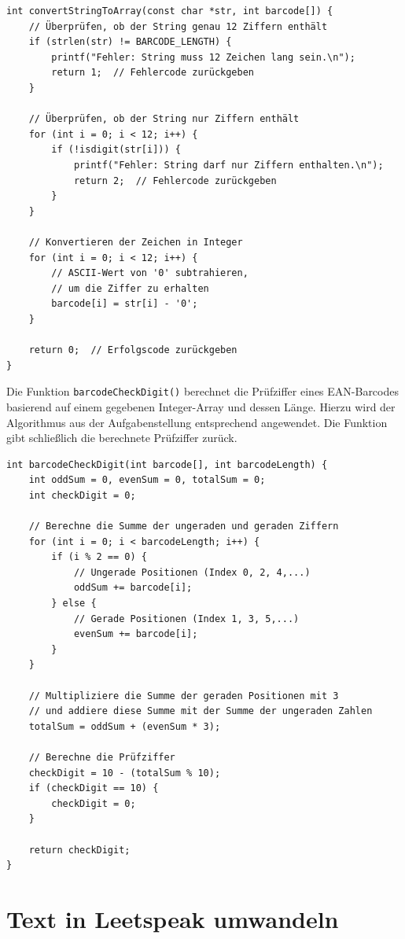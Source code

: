 \begin{verbatim}
int convertStringToArray(const char *str, int barcode[]) {
    // Überprüfen, ob der String genau 12 Ziffern enthält
    if (strlen(str) != BARCODE_LENGTH) {
        printf("Fehler: String muss 12 Zeichen lang sein.\n");
        return 1;  // Fehlercode zurückgeben
    }

    // Überprüfen, ob der String nur Ziffern enthält
    for (int i = 0; i < 12; i++) {
        if (!isdigit(str[i])) {
            printf("Fehler: String darf nur Ziffern enthalten.\n");
            return 2;  // Fehlercode zurückgeben
        }
    }

    // Konvertieren der Zeichen in Integer
    for (int i = 0; i < 12; i++) {
        // ASCII-Wert von '0' subtrahieren,
        // um die Ziffer zu erhalten
        barcode[i] = str[i] - '0';
    }

    return 0;  // Erfolgscode zurückgeben
}
\end{verbatim}

Die Funktion \texttt{barcodeCheckDigit()} berechnet die Prüfziffer eines
EAN-Barcodes basierend auf einem gegebenen Integer-Array und dessen Länge.
Hierzu wird der Algorithmus aus der Aufgabenstellung entsprechend angewendet.
Die Funktion gibt schließlich die berechnete Prüfziffer zurück.

\begin{verbatim}
int barcodeCheckDigit(int barcode[], int barcodeLength) {
    int oddSum = 0, evenSum = 0, totalSum = 0;
    int checkDigit = 0;

    // Berechne die Summe der ungeraden und geraden Ziffern
    for (int i = 0; i < barcodeLength; i++) {
        if (i % 2 == 0) {
            // Ungerade Positionen (Index 0, 2, 4,...)
            oddSum += barcode[i];
        } else {
            // Gerade Positionen (Index 1, 3, 5,...)
            evenSum += barcode[i];
        }
    }

    // Multipliziere die Summe der geraden Positionen mit 3
    // und addiere diese Summe mit der Summe der ungeraden Zahlen
    totalSum = oddSum + (evenSum * 3);

    // Berechne die Prüfziffer
    checkDigit = 10 - (totalSum % 10);
    if (checkDigit == 10) {
        checkDigit = 0;
    }

    return checkDigit;
}
\end{verbatim}




\chapter{Text in Leetspeak umwandeln}

